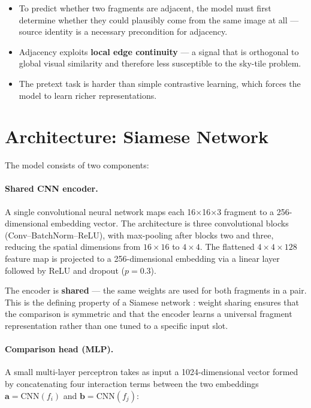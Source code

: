 \documentclass[12pt, a4paper]{article}
\begin{document}
\begin{itemize}
    \item To predict whether two fragments are adjacent, the model must first determine
          whether they could plausibly come from the same image at all — source identity
          is a necessary precondition for adjacency.
    \item Adjacency exploits \textbf{local edge continuity} — a signal that is
          orthogonal to global visual similarity and therefore less susceptible to the
          sky-tile problem.
    \item The pretext task is harder than simple contrastive learning, which forces the
          model to learn richer representations.
\end{itemize}

\section{Architecture: Siamese Network}

The model consists of two components:

\paragraph{Shared CNN encoder.}
A single convolutional neural network maps each 16$\times$16$\times$3 fragment to a
256-dimensional embedding vector. The architecture is three convolutional blocks
(Conv--BatchNorm--ReLU), with max-pooling after blocks two and three, reducing the
spatial dimensions from $16\times16$ to $4\times4$. The flattened $4\times4\times128$
feature map is projected to a 256-dimensional embedding via a linear layer followed by
ReLU and dropout ($p=0.3$).

The encoder is \textbf{shared} — the same weights are used for both fragments in a pair.
This is the defining property of a Siamese network \parencite{siamese1994}: weight
sharing ensures that the comparison is symmetric and that the encoder learns a universal
fragment representation rather than one tuned to a specific input slot.

\paragraph{Comparison head (MLP).}
A small multi-layer perceptron takes as input a 1024-dimensional vector formed by
concatenating four interaction terms between the two embeddings $\mathbf{a} =
\text{CNN}(f_i)$ and $\mathbf{b} = \text{CNN}(f_j)$:
\end{document}

